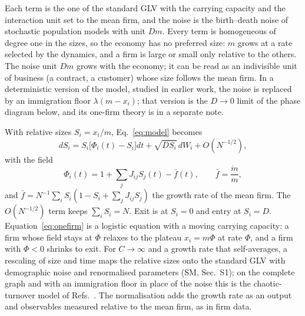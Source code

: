 \documentclass[pre,twocolumn,superscriptaddress,nofootinbib]{revtex4-2}
\begin{document}
Each term is the one of the standard GLV with the carrying capacity and the interaction unit set to
the mean firm, and the noise is the birth--death noise of stochastic population models
\cite{altieri2021} with unit $Dm$.  Every term is homogeneous of degree one in the sizes, so the
economy has no preferred size: $m$ grows at a rate selected by the dynamics, and a firm is large or
small only relative to the others.  The noise unit $Dm$ grows with the economy; it can be read as an
indivisible unit of business (a contract, a customer) whose size follows the mean firm.  In a
deterministic version of the model, studied in earlier work, the noise is replaced by an immigration
floor $\lambda(m-x_i)$; that version is the $D\to0$ limit of the phase diagram below, and its one-firm
theory is in a separate note.

With relative sizes $S_i=x_i/m$, Eq.~\eqref{eq:model} becomes
\begin{equation}
dS_i=S_i\big[\Phi_i(t)-S_i\big]dt+\sqrt{DS_i}\,dW_i+O(N^{-1/2}),
\label{eq:onefirm}
\end{equation}
with the field
\begin{equation}
\Phi_i(t)=1+\sum_jJ_{ij}S_j(t)-\bar f(t),\qquad \bar f=\frac{\dot m}{m},
\label{eq:field}
\end{equation}
and $\bar f=N^{-1}\sum_iS_i(1-S_i+\sum_jJ_{ij}S_j)$ the growth rate of the mean firm.  The $O(N^{-1/2})$
term keeps $\sum_iS_i=N$.  Exit is at $S_i=0$ and entry at $S_i=D$.  Equation~\eqref{eq:onefirm} is a
logistic equation with a moving carrying capacity: a firm whose field stays at $\Phi$ relaxes to the
plateau $x_i=m\Phi$ at rate $\Phi$, and a firm with $\Phi<0$ shrinks to exit.  For $C\to\infty$ and a
growth rate that self-averages, a rescaling of size and time maps the relative sizes onto the
standard GLV with demographic noise \cite{altieri2021} and renormalised parameters (SM, Sec.~S1); on the
complete graph and with an immigration floor in place of the noise this is the chaotic-turnover model
of Refs.~\cite{bunin2017,mallmin2024}.  The normalisation adds
the growth rate as an output and observables measured relative to the mean firm, as in firm data.
\end{document}
